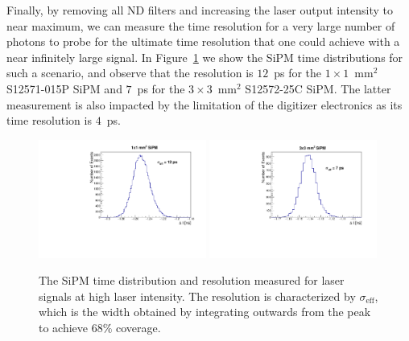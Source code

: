 Finally, by removing all ND filters and increasing the laser output intensity to near 
maximum, we can measure the time resolution for a very large number of photons 
to probe for the ultimate time resolution that one could achieve with a near 
infinitely large signal. In Figure~\ref{fig:LargeLightTimeResolution} we show 
the SiPM time distributions for such a scenario, and observe that the resolution 
is $12$~ps for the $1\times1$~$\mathrm{mm}^{2}$  S12571-015P SiPM and
$7$~ps for the $3\times 3$~$\mathrm{mm}^{2}$ S12572-25C SiPM. 
The latter measurement is also impacted by the limitation
of the digitizer electronics as its time resolution is $4$~ps. 

\begin{figure}[htbp] 
\centering
\includegraphics[width=0.49\textwidth]{figures/DeltaT_LargeNPhotons_1x1SiPM.pdf} 
\includegraphics[width=0.49\textwidth]{figures/DeltaT_LargeNPhotons_3x3SiPM.pdf} 
\caption{The SiPM time distribution and resolution measured for laser signals at high laser intensity.
The resolution is characterized by $\sigma_{\mathrm{eff}}$, which is the width obtained by integrating
outwards from the peak to achieve $68\%$ coverage.
} 
\label{fig:LargeLightTimeResolution} 
\end{figure} 

